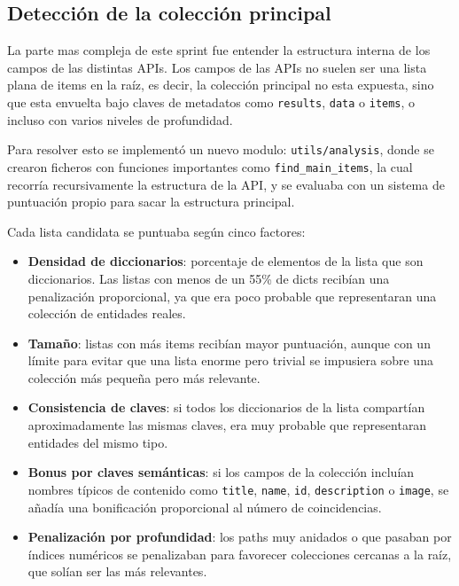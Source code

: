 \subsection{Detección de la colección principal}
\label{subsection:deteccion-coleccion-principal}

La parte mas compleja de este sprint fue entender la estructura interna de los campos de las distintas APIs. Los campos de las APIs no suelen ser una lista plana de items
en la raíz, es decir, la colección principal no esta expuesta, sino que esta envuelta bajo claves de metadatos como \texttt{results}, \texttt{data} o \texttt{items},
o incluso con varios niveles de profundidad. 

Para resolver esto se implementó un nuevo modulo: \texttt{utils/analysis}, donde se crearon ficheros con funciones importantes como \texttt{find\_main\_items}, la cual recorría recursivamente la estructura de la API, y se evaluaba con un sistema de puntuación propio para sacar la estructura principal.

Cada lista candidata se puntuaba según cinco factores:

\begin{itemize}
    \item \textbf{Densidad de diccionarios}: porcentaje de elementos de la lista que son diccionarios. Las listas con menos de un 55\% de dicts recibían una penalización proporcional, ya que era poco probable que representaran una colección de entidades reales.
    \item \textbf{Tamaño}: listas con más items recibían mayor puntuación, aunque con un límite para evitar que una lista enorme pero trivial se impusiera sobre una colección más pequeña pero más relevante.
    \item \textbf{Consistencia de claves}: si todos los diccionarios de la lista compartían aproximadamente las mismas claves, era muy probable que representaran entidades del mismo tipo.
    \item \textbf{Bonus por claves semánticas}: si los campos de la colección incluían nombres típicos de contenido como \texttt{title}, \texttt{name}, \texttt{id},    \texttt{description} o \texttt{image}, se añadía una bonificación proporcional al número de coincidencias.
    \item \textbf{Penalización por profundidad}: los paths muy anidados o que pasaban por índices numéricos se penalizaban para favorecer colecciones cercanas a la raíz, que solían ser las más relevantes.
\end{itemize}

